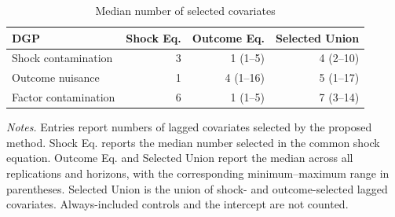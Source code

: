 \begin{table}[htb!]
\begin{center}
\caption{Median number of selected covariates}\label{tab:app_sim_numselect}
\begin{tabular}{lrrr}
\toprule
DGP & Shock Eq. & Outcome Eq. & Selected Union \\
\midrule
Shock contamination & 3 & 1 (1--5) & 4 (2--10) \\
Outcome nuisance & 1 & 4 (1--16) & 5 (1--17) \\
Factor contamination & 6 & 1 (1--5) & 7 (3--14) \\
\bottomrule
\end{tabular}
\end{center}
{\footnotesize \textit{Notes.} Entries report numbers of lagged covariates selected by the proposed method. Shock Eq. reports the median number selected in the common shock equation. Outcome Eq. and Selected Union report the median across all replications and horizons, with the corresponding minimum--maximum range in parentheses. Selected Union is the union of shock- and outcome-selected lagged covariates. Always-included controls and the intercept are not counted.}
\end{table}
